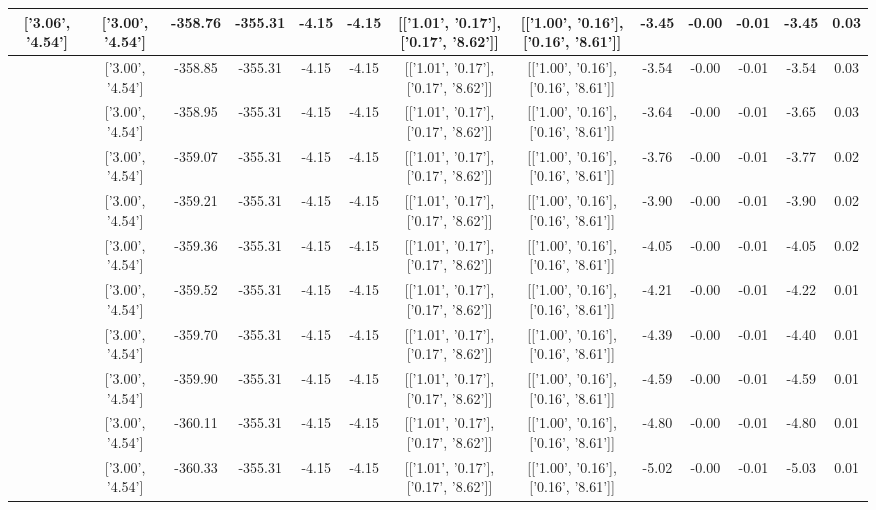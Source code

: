 \begin{table}[htbp]
\begin{adjustbox}{angle=90}
\begin{tabular}{|c|c|c|c|c|c|c|c|c|c|c|c|c|}
 ['3.06', '4.54'] & ['3.00', '4.54'] & -358.76 & -355.31 & -4.15 & -4.15 & [['1.01', '0.17'], ['0.17', '8.62']] & [['1.00', '0.16'], ['0.16', '8.61']] & -3.45 & -0.00 & -0.01 & -3.45 & 0.03\\ \hline
 ['3.08', '4.54'] & ['3.00', '4.54'] & -358.85 & -355.31 & -4.15 & -4.15 & [['1.01', '0.17'], ['0.17', '8.62']] & [['1.00', '0.16'], ['0.16', '8.61']] & -3.54 & -0.00 & -0.01 & -3.54 & 0.03\\ \hline
 ['3.09', '4.54'] & ['3.00', '4.54'] & -358.95 & -355.31 & -4.15 & -4.15 & [['1.01', '0.17'], ['0.17', '8.62']] & [['1.00', '0.16'], ['0.16', '8.61']] & -3.64 & -0.00 & -0.01 & -3.65 & 0.03\\ \hline
 ['3.10', '4.55'] & ['3.00', '4.54'] & -359.07 & -355.31 & -4.15 & -4.15 & [['1.01', '0.17'], ['0.17', '8.62']] & [['1.00', '0.16'], ['0.16', '8.61']] & -3.76 & -0.00 & -0.01 & -3.77 & 0.02\\ \hline
 ['3.11', '4.55'] & ['3.00', '4.54'] & -359.21 & -355.31 & -4.15 & -4.15 & [['1.01', '0.17'], ['0.17', '8.62']] & [['1.00', '0.16'], ['0.16', '8.61']] & -3.90 & -0.00 & -0.01 & -3.90 & 0.02\\ \hline
 ['3.13', '4.55'] & ['3.00', '4.54'] & -359.36 & -355.31 & -4.15 & -4.15 & [['1.01', '0.17'], ['0.17', '8.62']] & [['1.00', '0.16'], ['0.16', '8.61']] & -4.05 & -0.00 & -0.01 & -4.05 & 0.02\\ \hline
 ['3.14', '4.55'] & ['3.00', '4.54'] & -359.52 & -355.31 & -4.15 & -4.15 & [['1.01', '0.17'], ['0.17', '8.62']] & [['1.00', '0.16'], ['0.16', '8.61']] & -4.21 & -0.00 & -0.01 & -4.22 & 0.01\\ \hline
 ['3.15', '4.55'] & ['3.00', '4.54'] & -359.70 & -355.31 & -4.15 & -4.15 & [['1.01', '0.17'], ['0.17', '8.62']] & [['1.00', '0.16'], ['0.16', '8.61']] & -4.39 & -0.00 & -0.01 & -4.40 & 0.01\\ \hline
 ['3.16', '4.55'] & ['3.00', '4.54'] & -359.90 & -355.31 & -4.15 & -4.15 & [['1.01', '0.17'], ['0.17', '8.62']] & [['1.00', '0.16'], ['0.16', '8.61']] & -4.59 & -0.00 & -0.01 & -4.59 & 0.01\\ \hline
 ['3.17', '4.55'] & ['3.00', '4.54'] & -360.11 & -355.31 & -4.15 & -4.15 & [['1.01', '0.17'], ['0.17', '8.62']] & [['1.00', '0.16'], ['0.16', '8.61']] & -4.80 & -0.00 & -0.01 & -4.80 & 0.01\\ \hline
 ['3.19', '4.55'] & ['3.00', '4.54'] & -360.33 & -355.31 & -4.15 & -4.15 & [['1.01', '0.17'], ['0.17', '8.62']] & [['1.00', '0.16'], ['0.16', '8.61']] & -5.02 & -0.00 & -0.01 & -5.03 & 0.01\\ \hline

\end{tabular}
\end{adjustbox}
\end{table}
